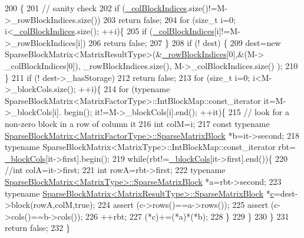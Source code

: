 \begin{DoxyCode}
200                                                                                                            
                                         \{
201     \textcolor{comment}{// sanity check}
202     \textcolor{keywordflow}{if} (\hyperlink{classg2o_1_1SparseBlockMatrix_aca008740c37d2d00b90f696ab19abb59}{\_colBlockIndices}.size()!=M->\_rowBlockIndices.size())
203       \textcolor{keywordflow}{return} \textcolor{keyword}{false};
204     \textcolor{keywordflow}{for} (\textcolor{keywordtype}{size\_t} i=0; i<\hyperlink{classg2o_1_1SparseBlockMatrix_aca008740c37d2d00b90f696ab19abb59}{\_colBlockIndices}.size(); ++i)\{
205       \textcolor{keywordflow}{if} (\hyperlink{classg2o_1_1SparseBlockMatrix_aca008740c37d2d00b90f696ab19abb59}{\_colBlockIndices}[i]!=M->\_rowBlockIndices[i])
206         \textcolor{keywordflow}{return} \textcolor{keyword}{false};
207     \}
208     \textcolor{keywordflow}{if} (! dest) \{
209       dest=\textcolor{keyword}{new} SparseBlockMatrix<MatrixResultType>(&\hyperlink{classg2o_1_1SparseBlockMatrix_ab0bd9c6d5b7b8704af1bc679032382e3}{\_rowBlockIndices}[0],&(M->
      \_colBlockIndices[0]), \_rowBlockIndices.size(), M->\_colBlockIndices.size() );
210     \}
211     \textcolor{keywordflow}{if} (! dest->\_hasStorage)
212       \textcolor{keywordflow}{return} \textcolor{keyword}{false};
213     \textcolor{keywordflow}{for} (\textcolor{keywordtype}{size\_t} i=0; i<M->\_blockCols.size(); ++i)\{
214       \textcolor{keywordflow}{for} (\textcolor{keyword}{typename} SparseBlockMatrix<MatrixFactorType>::IntBlockMap::const\_iterator it=M->\_blockCols[i].
      begin(); it!=M->\_blockCols[i].end(); ++it)\{
215         \textcolor{comment}{// look for a non-zero block in a row of column it}
216         \textcolor{keywordtype}{int} colM=i;
217         \textcolor{keyword}{const} \textcolor{keyword}{typename} \hyperlink{classg2o_1_1SparseBlockMatrix_ab2f7376cbf055803fda6527dcc43e3be}{SparseBlockMatrix<MatrixFactorType>::SparseMatrixBlock}
       *b=it->second;
218         \textcolor{keyword}{typename} SparseBlockMatrix<MatrixType>::IntBlockMap::const\_iterator rbt=
      \hyperlink{classg2o_1_1SparseBlockMatrix_ae236d56a01ba4d292450a518621b41f8}{\_blockCols}[it->first].begin();
219         \textcolor{keywordflow}{while}(rbt!=\hyperlink{classg2o_1_1SparseBlockMatrix_ae236d56a01ba4d292450a518621b41f8}{\_blockCols}[it->first].end())\{
220           \textcolor{comment}{//int colA=it->first;}
221           \textcolor{keywordtype}{int} rowA=rbt->first;
222           \textcolor{keyword}{typename} \hyperlink{classg2o_1_1SparseBlockMatrix_ab2f7376cbf055803fda6527dcc43e3be}{SparseBlockMatrix<MatrixType>::SparseMatrixBlock}
       *a=rbt->second;
223           \textcolor{keyword}{typename} \hyperlink{classg2o_1_1SparseBlockMatrix_ab2f7376cbf055803fda6527dcc43e3be}{SparseBlockMatrix<MatrixResultType>::SparseMatrixBlock}
       *\hyperlink{sparse__block__matrix_8hpp_a4e1e0e72dd773439e333c84dd762a9c3}{c}=dest->block(rowA,colM,\textcolor{keyword}{true});
224           assert (c->rows()==a->rows());
225           assert (c->cols()==b->cols());
226           ++rbt;
227           (*c)+=(*a)*(*b);
228         \}
229       \}
230     \}
231     \textcolor{keywordflow}{return} \textcolor{keyword}{false};
232   \}
\end{DoxyCode}
